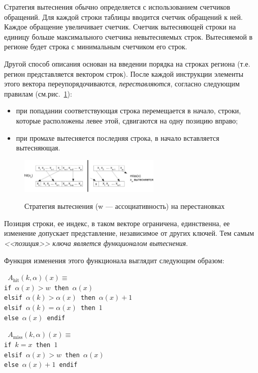 \begin{enumerate}
Стратегия вытеснения \LRU обычно определяется с использованием
счетчиков обращений. Для каждой строки таблицы
вводится счетчик обращений к ней. Каждое обращение увеличивает
счетчик. Счетчик вытесняющей строки на единицу больше максимального счетчика невытесняемых строк. Вытесняемой в регионе будет строка с минимальным счетчиком его строк.

Другой способ описания \LRU основан на введении порядка на строках региона (т.е.
регион представляется вектором строк). После каждой инструкции элементы этого вектора переупорядочиваются, \emph{переставляются}, согласно следующим правилам (см.рис.~\ref{fig:lru1}):
\begin{itemize}
\item при попадании соответствующая строка перемещается в начало, строки, которые расположены левее этой, сдвигаются на одну позицию вправо;
\item при промахе вытесняется последняя строка, в начало вставляется вытесняющая.
\end{itemize}

\begin{figure}[h] \center
  \includegraphics[width=0.6\textwidth]{2.theor/lru1}\\
  \caption{Стратегия вытеснения \LRU (w --- ассоциативность) на
перестановках}\label{fig:lru1}
\end{figure}

Позиция строки, ее индекс, в таком векторе ограничена, единственна, ее изменение допускает представление, независимое от других ключей. Тем самым \emph{<<позиция>> ключа является функционалом вытеснения}.

Функция изменения этого функционала выглядит следующим образом:\\

\parbox{0.5\textwidth}{ \tt
$A_{\mbox{hit}}(k, \alpha)(x) \equiv$\\
if $\alpha(x) > w$ then $\alpha(x)$\\
elsif $\alpha(k) > \alpha(x)$ then $\alpha(x)+1$\\
elsif $\alpha(k) = \alpha(x)$ then $1$\\
else $\alpha(x)$ endif%
}\parbox{0.5\textwidth}{\tt
$A_{\mbox{miss}}(k, \alpha)(x) \equiv$\\
if $k = x$ then $1$\\
elsif $\alpha(x) > w$ then $\alpha(x)$\\
else $\alpha(x) + 1$ endif}\\


\end{enumerate}
